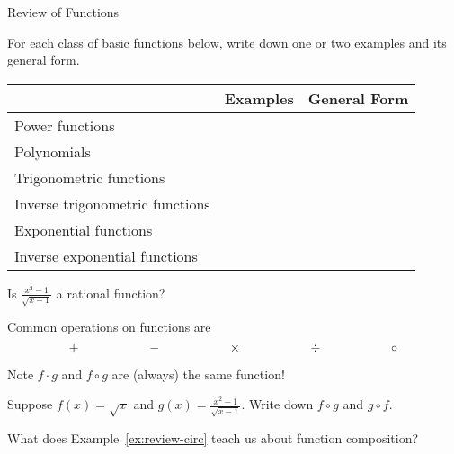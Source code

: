 \documentclass[../main.tex]{subfiles}
\begin{document}
\begin{lesson}{Review of Functions}
  \begin{example}
    For each class of basic functions below, write down one or two examples and its general form.

    \begin{center}
      \begin{tabular}{p{1.25in}p{3.5in}|p{1.5in}}
      & Examples & General Form \\\midrule
        Power \newline functions & & \\[0.75in]\midrule
        Polynomials & & \\[0.75in]\midrule
        Trigonometric \newline functions & & \\[0.75in]\midrule
        Inverse \newline trigonometric \newline functions & & \\[0.75in]\midrule
        Exponential \newline functions & & \\[0.75in]\midrule
        Inverse \newline exponential \newline functions & & \\[0.75in]
      \end{tabular}
    \end{center}
  \end{example}

  \faComments{} Is \(\frac{x^{2}-1}{\sqrt{x-1}}\) a rational function?
  \clearpage

  Common operations on functions are
  \[
    + \hspace{0.75in}
    - \hspace{0.75in}
    \times \hspace{0.75in}
    \div \hspace{0.75in}
    \circ
  \]

  \faExclamationTriangle{}
  Note \(f \cdot g\) and \(f \circ g\) are \underline{} (always) the same function!

  \begin{example} \label{ex:review-circ}
    Suppose \(f(x) = \sqrt{x}\) and \(g(x) = \frac{x^{2}-1}{\sqrt{x-1}}\). Write down \(f \circ g\) and \(g \circ f\).

    \faComments{} What does Example~\ref{ex:review-circ} teach us about function composition?
  \end{example}
  \clearpage


\end{lesson}
\end{document}
